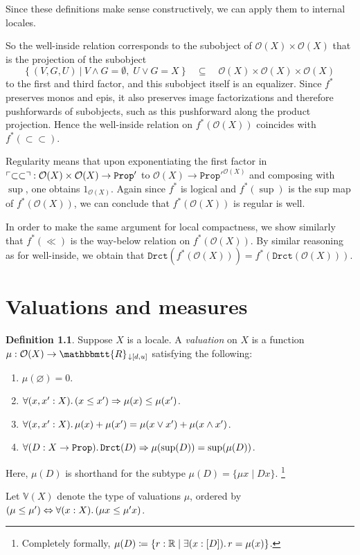 \documentclass[11pt, oneside, article]{memoir}
\theoremstyle{plain}
\theoremstyle{definition}
\newtheorem{definition}[theorem]{Definition}
\theoremstyle{remark}
\DeclarePairedDelimiter{\subtype}{[}{]}
\DeclarePairedDelimiter{\classify}{\ulcorner}{\urcorner}
\newcommand{\const}[1]{\mathtt{#1}}
\newcommand{\internal}[1]{\raisebox{-.03ex}{$\mathbbmtt{#1}$}}
\newcommand{\hs}{\hspace{1.1pt}}
\newcommand{\RR}{\mathbb{R}}
\newcommand{\VV}{\mathbb{V}}
\newcommand{\tRR}{\internal{R}\hs}
\newcommand{\tRRat}[1]{\tRR_{\SeeInline{#1}}}
\newcommand{\Prop}{\const{Prop}}
\newcommand{\SeeSymbol}{{\down}}  %
\newcommand{\SeeInline}[1]{\SeeSymbol{#1}}
\newcommand{\down}{\mathord{\downarrow}}
\newcommand{\imp}{\Rightarrow}
\renewcommand{\iff}{\Leftrightarrow}
\begin{document}
Since these definitions make sense constructively, we can apply them to internal locales.

So the well-inside relation corresponds to the subobject of $\mathcal{O}(X)\times\mathcal{O}(X)$ that is the projection of the subobject
\[
	\{ \: (V,G,U) \:|\: V\wedge G = \emptyset, \; U\vee G = X \: \} \quad \subseteq \quad \mathcal{O}(X)\times\mathcal{O}(X)\times\mathcal{O}(X)
\]
to the first and third factor, and this subobject itself is an equalizer. Since $f^*$ preserves monos and epis, it also preserves image factorizations and therefore pushforwards of subobjects, such as this pushforward along the product projection. Hence the well-inside relation on $f^*(\mathcal{O}(X))$ coincides with $f^*(\subset\subset)$.

Regularity means that upon exponentiating the first factor in $\classify{\subset\subset} : \mathcal{O}(X)\times\mathcal{O}(X)\to\Prop'$ to $\mathcal{O}(X)\to\Prop'^{\mathcal{O}(X)}$ and composing with $\sup$, one obtains $1_{\mathcal{O}(X)}$. Again since $f^*$ is logical and $f^*(\sup)$ is the sup map of $f^*(\mathcal{O}(X))$, we can conclude that $f^*(\mathcal{O}(X))$ is regular is well.

In order to make the same argument for local compactness, we show similarly that $f^*(\ll)$ is the way-below relation on $f^*(\mathcal{O}(X))$. By similar reasoning as for well-inside, we obtain that $\const{Drct}(f^*(\mathcal{O}(X))) = f^*(\const{Drct}(\mathcal{O}(X)))$.

\chapter{Valuations and measures}



\begin{definition}
Suppose $X$ is a locale. A \emph{valuation} on $X$ is a function $\mu:\mathcal{O}(X)\to\tRRat{[d,u]}$ satisfying the following:
\begin{enumerate}
	\item $\mu(\varnothing)=0$.
	\item $\forall(x,x':X)\ldotp(x\leq x')\imp\mu(x)\leq\mu(x')$.
	\item $\forall(x,x':X)\ldotp\mu(x)+\mu(x')=\mu(x\vee x')+\mu(x\wedge x')$.
	\item $\forall(D:X\to\Prop)\ldotp\const{Drct}(D)\imp \mu(\sup(D))=\sup(\mu(D))$.
\end{enumerate}
Here, $\mu(D)$ is shorthand for the subtype $\mu(D)=\{\mu x\mid Dx\}$.%
\footnote{Completely formally, $\mu(D)\coloneqq\{r:\RR\mid\exists(x:\subtype{D})\ldotp r=\mu(x)\}$.}

Let $\VV(X)$ denote the type of valuations $\mu$, ordered by $(\mu\leq\mu')\iff\forall(x:X)\ldotp(\mu x\leq \mu'x)$.
\end{definition}
\end{document}
